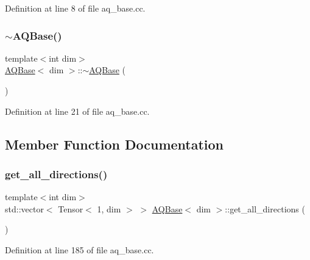 Definition at line 8 of file aq\+\_\+base.\+cc.

\mbox{\label{class_a_q_base_ab394068aae3c9b3f3932c3bfa3edceab}} 
\subsubsection{\texorpdfstring{$\sim$\+A\+Q\+Base()}{~AQBase()}}
{\footnotesize\ttfamily template$<$int dim$>$ \\
\hyperlink{class_a_q_base}{A\+Q\+Base}$<$ dim $>$\+::$\sim$\hyperlink{class_a_q_base}{A\+Q\+Base} (\begin{DoxyParamCaption}{ }\end{DoxyParamCaption})\hspace{0.3cm}{\ttfamily [virtual]}}



Definition at line 21 of file aq\+\_\+base.\+cc.



\subsection{Member Function Documentation}
\mbox{\label{class_a_q_base_ac2e0120510426f0b1dded2d5b546038b}} 
\subsubsection{\texorpdfstring{get\+\_\+all\+\_\+directions()}{get\_all\_directions()}}
{\footnotesize\ttfamily template$<$int dim$>$ \\
std\+::vector$<$ Tensor$<$ 1, dim $>$ $>$ \hyperlink{class_a_q_base}{A\+Q\+Base}$<$ dim $>$\+::get\+\_\+all\+\_\+directions (\begin{DoxyParamCaption}{ }\end{DoxyParamCaption})}



Definition at line 185 of file aq\+\_\+base.\+cc.

\mbox{\label{class_a_q_base_ac3db7e901486ff088e4eac2f1401f3b6}} 
